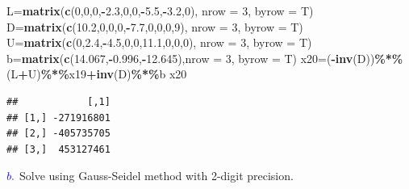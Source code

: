 \documentclass[
]{article}
\newenvironment{Shaded}{\begin{snugshade}}{\end{snugshade}}
\newcommand{\AttributeTok}[1]{\textcolor[rgb]{0.13,0.29,0.53}{#1}}
\newcommand{\DecValTok}[1]{\textcolor[rgb]{0.00,0.00,0.81}{#1}}
\newcommand{\FloatTok}[1]{\textcolor[rgb]{0.00,0.00,0.81}{#1}}
\newcommand{\FunctionTok}[1]{\textcolor[rgb]{0.13,0.29,0.53}{\textbf{#1}}}
\newcommand{\NormalTok}[1]{#1}
\newcommand{\OtherTok}[1]{\textcolor[rgb]{0.56,0.35,0.01}{#1}}
\newcommand{\SpecialCharTok}[1]{\textcolor[rgb]{0.81,0.36,0.00}{\textbf{#1}}}
\begin{document}
\begin{Shaded}
\begin{Highlighting}[]
\NormalTok{  L}\OtherTok{=}\FunctionTok{matrix}\NormalTok{(}\FunctionTok{c}\NormalTok{(}\DecValTok{0}\NormalTok{,}\DecValTok{0}\NormalTok{,}\DecValTok{0}\NormalTok{,}\SpecialCharTok{{-}}\FloatTok{2.3}\NormalTok{,}\DecValTok{0}\NormalTok{,}\DecValTok{0}\NormalTok{,}\SpecialCharTok{{-}}\FloatTok{5.5}\NormalTok{,}\SpecialCharTok{{-}}\FloatTok{3.2}\NormalTok{,}\DecValTok{0}\NormalTok{), }\AttributeTok{nrow =} \DecValTok{3}\NormalTok{, }\AttributeTok{byrow =}\NormalTok{ T)}
\NormalTok{  D}\OtherTok{=}\FunctionTok{matrix}\NormalTok{(}\FunctionTok{c}\NormalTok{(}\FloatTok{10.2}\NormalTok{,}\DecValTok{0}\NormalTok{,}\DecValTok{0}\NormalTok{,}\DecValTok{0}\NormalTok{,}\SpecialCharTok{{-}}\FloatTok{7.7}\NormalTok{,}\DecValTok{0}\NormalTok{,}\DecValTok{0}\NormalTok{,}\DecValTok{0}\NormalTok{,}\DecValTok{9}\NormalTok{), }\AttributeTok{nrow =} \DecValTok{3}\NormalTok{, }\AttributeTok{byrow =}\NormalTok{ T)}
\NormalTok{  U}\OtherTok{=}\FunctionTok{matrix}\NormalTok{(}\FunctionTok{c}\NormalTok{(}\DecValTok{0}\NormalTok{,}\FloatTok{2.4}\NormalTok{,}\SpecialCharTok{{-}}\FloatTok{4.5}\NormalTok{,}\DecValTok{0}\NormalTok{,}\DecValTok{0}\NormalTok{,}\FloatTok{11.1}\NormalTok{,}\DecValTok{0}\NormalTok{,}\DecValTok{0}\NormalTok{,}\DecValTok{0}\NormalTok{), }\AttributeTok{nrow =} \DecValTok{3}\NormalTok{, }\AttributeTok{byrow =}\NormalTok{ T)}
\NormalTok{  b}\OtherTok{=}\FunctionTok{matrix}\NormalTok{(}\FunctionTok{c}\NormalTok{(}\FloatTok{14.067}\NormalTok{,}\SpecialCharTok{{-}}\FloatTok{0.996}\NormalTok{,}\SpecialCharTok{{-}}\FloatTok{12.645}\NormalTok{),}\AttributeTok{nrow =} \DecValTok{3}\NormalTok{, }\AttributeTok{byrow =}\NormalTok{ T)}
\NormalTok{  x20}\OtherTok{=}\NormalTok{(}\SpecialCharTok{{-}}\FunctionTok{inv}\NormalTok{(D))}\SpecialCharTok{\%*\%}\NormalTok{(L}\SpecialCharTok{+}\NormalTok{U)}\SpecialCharTok{\%*\%}\NormalTok{x19}\SpecialCharTok{+}\FunctionTok{inv}\NormalTok{(D)}\SpecialCharTok{\%*\%}\NormalTok{b}
\NormalTok{  x20}
\end{Highlighting}
\end{Shaded}

\begin{verbatim}
##            [,1]
## [1,] -271916801
## [2,] -405735705
## [3,]  453127461
\end{verbatim}

\(\textcolor{blue}{b.}\) Solve using Gauss-Seidel method with 2-digit
precision.
\end{document}
